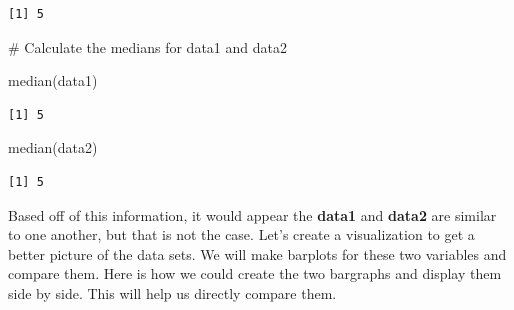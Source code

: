 \documentclass[
  letterpaper,
  DIV=11,
  numbers=noendperiod]{scrreprt}
\newenvironment{Shaded}{\begin{snugshade}}{\end{snugshade}}
\newcommand{\CommentTok}[1]{\textcolor[rgb]{0.37,0.37,0.37}{#1}}
\newcommand{\FunctionTok}[1]{\textcolor[rgb]{0.28,0.35,0.67}{#1}}
\newcommand{\NormalTok}[1]{\textcolor[rgb]{0.00,0.23,0.31}{#1}}
\begin{document}
\begin{verbatim}
[1] 5
\end{verbatim}

\begin{Shaded}
\begin{Highlighting}[]
\CommentTok{\# Calculate the medians for data1 and data2}

\FunctionTok{median}\NormalTok{(data1)}
\end{Highlighting}
\end{Shaded}

\begin{verbatim}
[1] 5
\end{verbatim}

\begin{Shaded}
\begin{Highlighting}[]
\FunctionTok{median}\NormalTok{(data2)}
\end{Highlighting}
\end{Shaded}

\begin{verbatim}
[1] 5
\end{verbatim}

Based off of this information, it would appear the \textbf{data1} and
\textbf{data2} are similar to one another, but that is not the case.
Let's create a visualization to get a better picture of the data sets.
We will make barplots for these two variables and compare them. Here is
how we could create the two bargraphs and display them side by side.
This will help us directly compare them.
\end{document}
